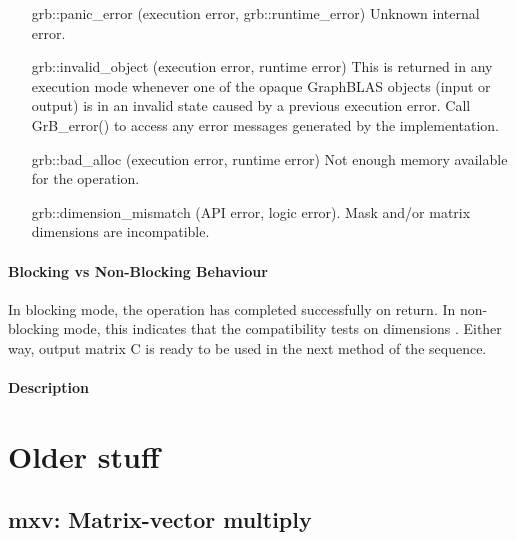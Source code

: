 \begin{itemize}[leftmargin=2.1in]
    \item[{\sf grb::panic\_error}]           (execution error, grb::runtime\_error) Unknown internal error.

    \item[{\sf grb::invalid\_object}] (execution error, runtime error) This is returned in any execution mode 
    whenever one of the opaque GraphBLAS objects (input or output) is in an invalid 
    state caused by a previous execution error.  Call {\sf GrB\_error()} to access 
    any error messages generated by the implementation.

    \item[{\sf grb::bad\_alloc}] (execution error, runtime error) Not enough memory available for the operation.

    \item[{\sf grb::dimension\_mismatch}] (API error, logic error). Mask and/or matrix
    dimensions are incompatible. 
\end{itemize}

\paragraph{Blocking vs Non-Blocking Behaviour}

In blocking mode, the operation has completed successfully on return.
In non-blocking mode, this indicates that the compatibility 
tests on dimensions . 
Either way, output matrix {\sf C} is ready to be used in the next method of
the sequence.

\paragraph{Description}

\section{Older stuff}

\subsection{{\sf mxv}: Matrix-vector multiply}

